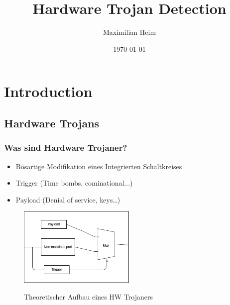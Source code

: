 \documentclass[11pt]{beamer}
\author{Maximilian Heim}
\title{Hardware Trojan Detection}
\institute{University Albstadt-Sigmaringen}
\date{\today}
\begin{document}
\begin{frame}
\titlepage
\end{frame}

\begin{frame}
\tableofcontents
\end{frame}

\section{Introduction}
\subsection{Hardware Trojans}
\begin{frame}
    \frametitle{Was sind Hardware Trojaner?}
    \begin{itemize}
    \item Bösartige Modifikation eines Integrierten Schaltkreises
    \item Trigger (Time bombs, cominational...)
    \item Payload (Denial of service, keys\ldots)
    \end{itemize}
    \begin{figure}
        \caption{Theoretischer Aufbau eines HW Trojaners}
        \includegraphics[width=0.5\textwidth]{triggerpayload.png}
        \label{trpl}
    \end{figure}
\end{frame}
\end{document}
